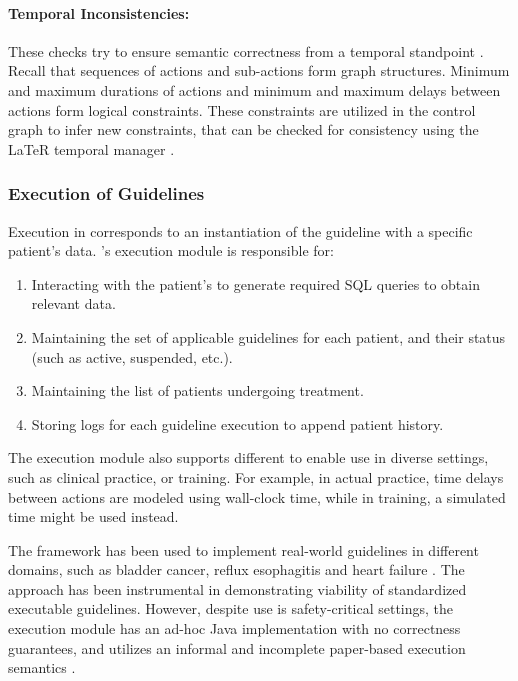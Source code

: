 \paragraph{Temporal Inconsistencies:}

These checks try to ensure semantic correctness from a temporal standpoint
\cite{TerenzianiAIM01}. Recall that sequences of actions and sub-actions form graph
structures. Minimum and maximum durations of actions and minimum and maximum delays
between actions form logical constraints. These constraints
are utilized in the control graph to infer new constraints, that can be checked
for consistency using the LaTeR temporal manager \cite{BrusoniExpert97,TerenzianiAIM01} .

\subsubsection{Execution of \GLARE{} Guidelines}\label{sec:glare}

Execution in \GLARE{} corresponds to an instantiation of the guideline
with a specific patient's data. \GLARE{}'s execution module is responsible
for:
\begin{enumerate}[label=\arabic*)]
  \item Interacting with the patient's \EHR{} to generate
    required SQL \cite{SQLBook89} queries to obtain relevant data.
  \item Maintaining the set of applicable guidelines for each patient, and their
    status (such as active, suspended, etc.).
  \item Maintaining the list of patients undergoing treatment.
  \item Storing logs for each guideline execution to append patient history.
\end{enumerate}
The execution module also supports different 
to enable use in diverse settings, such as clinical practice, or training.
For example, in actual practice, time delays between actions are modeled
using wall-clock time, while in training, a simulated time might be used instead.

The \GLARE{} framework has been used to implement real-world guidelines in
different domains, such as bladder cancer, reflux esophagitis
and heart failure \cite{TerenzianiBook04}. The approach has been instrumental in
demonstrating viability of standardized executable guidelines. However, despite use is
safety-critical settings, the execution module has an ad-hoc Java
implementation with no correctness guarantees, and utilizes
an informal and incomplete paper-based execution semantics \cite{TerenzianiAIM01}.

